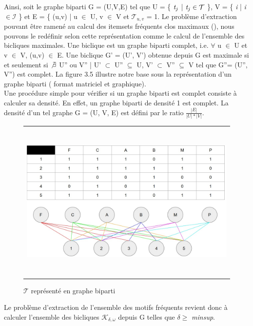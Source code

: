 \documentclass[a4paper,10pt]{report}
\begin{document}
	Ainsi, soit le graphe biparti G = (U,V,E) tel que U = \{ $\emph{t}_{j}$ | $\emph{t}_{j} \in \mathcal{T}$ \}, V = \{ \emph{i} | \emph{i} $\in \mathcal{I}$ \} et E = \{ (u,v) | u $\in$ U, v $\in$ V et $\mathcal{T}_{u,v}$ = 1. Le problème d'extraction pouvant être ramené au calcul des itemsets fréquents clos maximaux (\cite{ZAK00}), nous pouvons le redéfinir selon cette représentation comme le calcul de l'ensemble des bicliques maximales. Une biclique est un graphe biparti complet, i.e. $\forall$ u $\in$ U et v $\in$ V, (u,v) $\in$ E. Une biclique G' = (U', V') obtenue depuis G est maximale si et seulement si $\not\exists$ U'' ou V'' | U' $\subset$ U'' $\subseteq$ U, V' $\subset$ V'' $\subseteq$ V tel que G''= (U'', V'') est complet. La figure 3.5 illustre notre base sous la représentation d'un graphe biparti ( format matriciel et graphique).\\
	
	Une procédure simple pour vérifier si un graphe biparti est complet consiste à calculer sa densité. En effet, un graphe biparti de densité 1 est complet. La densité d'un tel graphe G = (U, V, E) est défini par le ratio $\frac{|E|}{|U|*|V|}$. \\
	
\begin{figure}
	\begin{adjustwidth}{-1cm}{}
	\begin{tabular}{l}
	\includegraphics[width=15cm,height=8cm]{./img/graphe_biparti}\\
	\end{tabular}
	\caption{\label{fig:text}$\mathcal{T}$ représenté en graphe biparti}
	\end{adjustwidth}
\end{figure}

Le problème d'extraction de l'ensemble des motifs fréquents revient donc à calculer l'ensemble des bicliques $\mathcal{K}_{\delta, \omega}$ depuis G telles que $\delta \geq$ \emph{minsup}. \\
\end{document}
